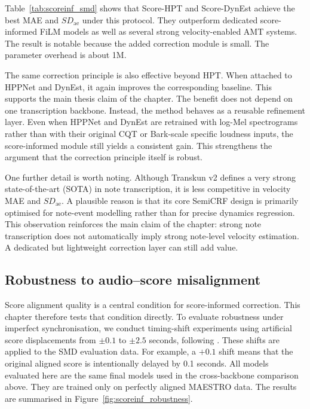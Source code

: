 Table~\ref{tab:scoreinf_smd} shows that Score-HPT and Score-DynEst achieve the best MAE and \(SD_{\mathrm{ae}}\) under this protocol. They outperform dedicated score-informed FiLM models as well as several strong velocity-enabled AMT systems. The result is notable because the added correction module is small. The parameter overhead is about 1M.

The same correction principle is also effective beyond HPT. When attached to HPPNet and DynEst, it again improves the corresponding baseline. This supports the main thesis claim of the chapter. The benefit does not depend on one transcription backbone. Instead, the method behaves as a reusable refinement layer. Even when HPPNet and DynEst are retrained with log-Mel spectrograms rather than with their original CQT or Bark-scale specific loudness inputs, the score-informed module still yields a consistent gain. This strengthens the argument that the correction principle itself is robust.

One further detail is worth noting. Although Transkun v2 defines a very strong state-of-the-art (SOTA) in note transcription, it is less competitive in velocity MAE and \(SD_{\mathrm{ae}}\). A plausible reason is that its core SemiCRF design is primarily optimised for note-event modelling rather than for precise dynamics regression. This observation reinforces the main claim of the chapter: strong note transcription does not automatically imply strong note-level velocity estimation. A dedicated but lightweight correction layer can still add value.

\subsection{Robustness to audio--score misalignment}
\label{sec:scoreinf:results:robustness}

Score alignment quality is a central condition for score-informed correction. This chapter therefore tests that condition directly. To evaluate robustness under imperfect synchronisation, we conduct timing-shift experiments using artificial score displacements from $\pm0.1$ to $\pm2.5$ seconds, following \cite{kim2024method}. These shifts are applied to the SMD evaluation data. For example, a $+0.1$ shift means that the original aligned score is intentionally delayed by 0.1 seconds. All models evaluated here are the same final models used in the cross-backbone comparison above. They are trained only on perfectly aligned MAESTRO data. The results are summarised in Figure~\ref{fig:scoreinf_robustness}.

